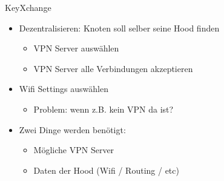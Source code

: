 \begin{frame}{KeyXchange}
    \begin{itemize}
        \item Dezentralisieren: Knoten soll selber seine Hood finden
        \begin{itemize}
            \item VPN Server auswählen
            \item VPN Server alle Verbindungen akzeptieren
        \end{itemize}
        \item Wifi Settings auswählen
        \begin{itemize}
            \item Problem: wenn z.B. kein VPN da ist?
        \end{itemize}
        \item Zwei Dinge werden benötigt: 
        \begin{itemize}
            \item Mögliche VPN Server
            \item Daten der Hood (Wifi / Routing / etc)
        \end{itemize}
    \end{itemize}
\end{frame}

